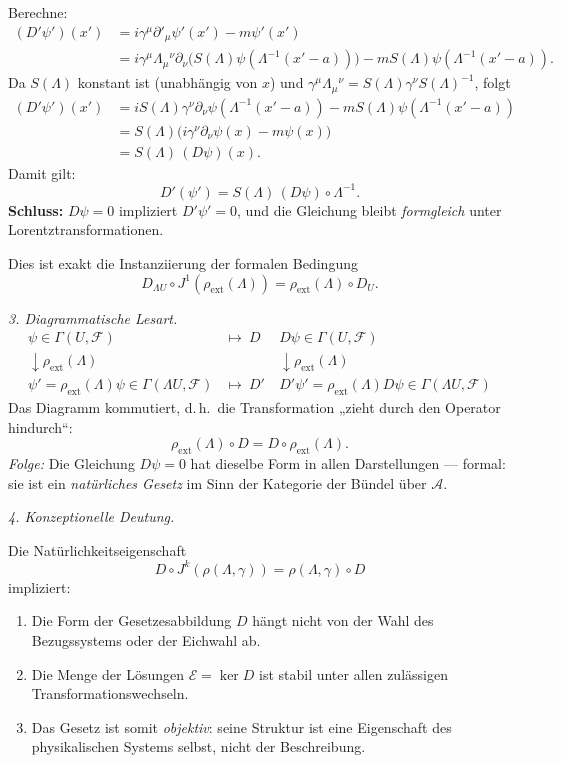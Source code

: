 \documentclass[10pt, letterpaper]{article}
\begin{document}
Berechne:
\begin{align*}
(D'\psi')(x')
&= i\gamma^\mu\partial'_\mu\psi'(x') - m\psi'(x')\\
&= i\gamma^\mu\Lambda_\mu{}^\nu\partial_\nu
\big(S(\Lambda)\psi(\Lambda^{-1}(x'-a))\big) - m S(\Lambda)\psi(\Lambda^{-1}(x'-a)).
\end{align*}
Da $S(\Lambda)$ konstant ist (unabhängig von $x$) und
$\gamma^\mu\Lambda_\mu{}^\nu=S(\Lambda)\gamma^\nu S(\Lambda)^{-1}$,
folgt
\begin{align*}
(D'\psi')(x')
&= i S(\Lambda)\gamma^\nu\partial_\nu\psi(\Lambda^{-1}(x'-a)) - mS(\Lambda)\psi(\Lambda^{-1}(x'-a))\\
&= S(\Lambda)\big(i\gamma^\nu\partial_\nu\psi(x)-m\psi(x)\big)\\
&= S(\Lambda)\,(D\psi)(x).
\end{align*}
Damit gilt:
\[
D'(\psi')=S(\Lambda)\,(D\psi)\circ\Lambda^{-1}.
\]
\textbf{Schluss:}
$D\psi=0$ impliziert $D'\psi'=0$,
und die Gleichung bleibt \emph{formgleich} unter Lorentztransformationen.  

Dies ist exakt die Instanziierung der formalen Bedingung
\[
D_{\Lambda U}\circ J^1(\rho_{\mathrm{ext}}(\Lambda))
= \rho_{\mathrm{ext}}(\Lambda)\circ D_U.
\]

\bigskip
\emph{3. Diagrammatische Lesart.}
\[
\begin{array}{ccc}
\psi \in \Gamma(U,\mathcal F) & \mapsto{\ D\ } & D\psi \in \Gamma(U,\mathcal F)\\[0.4em]
\downarrow \rho_{\mathrm{ext}}(\Lambda) & & \downarrow \rho_{\mathrm{ext}}(\Lambda)\\[0.4em]
\psi'=\rho_{\mathrm{ext}}(\Lambda)\psi \in \Gamma(\Lambda U,\mathcal F)
& \mapsto{\ D'\ } &
D'\psi' = \rho_{\mathrm{ext}}(\Lambda)D\psi \in \Gamma(\Lambda U,\mathcal F)
\end{array}
\]
Das Diagramm kommutiert, d.\,h.\ die Transformation „zieht durch den Operator hindurch“:
\[
\rho_{\mathrm{ext}}(\Lambda)\circ D = D\circ \rho_{\mathrm{ext}}(\Lambda).
\]
\emph{Folge:}
Die Gleichung $D\psi=0$ hat dieselbe Form in allen Darstellungen —  
formal: sie ist ein \emph{natürliches Gesetz} im Sinn der Kategorie der Bündel über $\mathcal A$.

\bigskip
\emph{4. Konzeptionelle Deutung.}

Die Natürlichkeitseigenschaft
\[
D\circ J^k(\rho(\Lambda,\gamma)) = \rho(\Lambda,\gamma)\circ D
\]
impliziert:
\begin{enumerate}
\item Die Form der Gesetzesabbildung $D$ hängt nicht von der Wahl des Bezugssystems
      oder der Eichwahl ab.
\item Die Menge der Lösungen $\mathcal E=\ker D$ ist stabil unter allen zulässigen
      Transformationswechseln.
\item Das Gesetz ist somit \emph{objektiv}: seine Struktur ist eine Eigenschaft
      des physikalischen Systems selbst, nicht der Beschreibung.
\end{enumerate}
\end{document}
